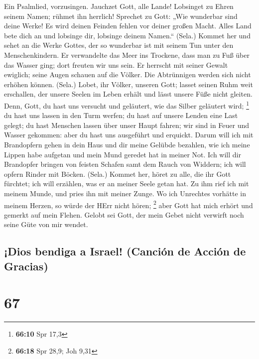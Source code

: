  Ein Psalmlied, vorzusingen. Jauchzet Gott, alle Lande!
 Lobsinget zu Ehren seinem Namen; rühmet ihn herrlich!
 Sprechet zu Gott: „Wie wunderbar sind deine Werke! Es
wird deinen Feinden fehlen vor deiner großen Macht.  Alles
Land bete dich an und lobsinge dir, lobsinge deinem Namen.`` (Sela.)
 Kommet her und sehet an die Werke Gottes, der so
wunderbar ist mit seinem Tun unter den Menschenkindern. 
Er verwandelte das Meer ins Trockene, dass man zu Fuß über das Wasser
ging; dort freuten wir uns sein.  Er herrscht mit seiner
Gewalt ewiglich; seine Augen schauen auf die Völker. Die Abtrünnigen
werden sich nicht erhöhen können. (Sela.)  Lobet, ihr
Völker, unseren Gott; lasset seinen Ruhm weit erschallen, 
der unsere Seelen im Leben erhält und lässt unsere Füße nicht gleiten.
 Denn, Gott, du hast uns versucht und geläutert, wie das
Silber geläutert wird; \footnote{\textbf{66:10} Spr 17,3}
 du hast uns lassen in den Turm werfen; du hast auf
unsere Lenden eine Last gelegt;  du hast Menschen lassen
über unser Haupt fahren; wir sind in Feuer und Wasser gekommen: aber du
hast uns ausgeführt und erquickt.  Darum will ich mit
Brandopfern gehen in dein Haus und dir meine Gelübde bezahlen,
 wie ich meine Lippen habe aufgetan und mein Mund geredet
hat in meiner Not.  Ich will dir Brandopfer bringen von
feisten Schafen samt dem Rauch von Widdern; ich will opfern Rinder mit
Böcken. (Sela.)  Kommet her, höret zu alle, die ihr Gott
fürchtet; ich will erzählen, was er an meiner Seele getan hat.
 Zu ihm rief ich mit meinem Munde, und pries ihn mit
meiner Zunge.  Wo ich Unrechtes vorhätte in meinem
Herzen, so würde der HErr nicht hören; \footnote{\textbf{66:18} Spr
  28,9; Joh 9,31}  aber Gott hat mich erhört und gemerkt
auf mein Flehen.  Gelobt sei Gott, der mein Gebet nicht
verwirft noch seine Güte von mir wendet.

\hypertarget{dios-bendiga-a-israel-canciuxf3n-de-acciuxf3n-de-gracias}{%
\subsection{¡Dios bendiga a Israel! (Canción de Acción de
Gracias)}\label{dios-bendiga-a-israel-canciuxf3n-de-acciuxf3n-de-gracias}}

\hypertarget{section-66}{%
\section{67}\label{section-66}}

